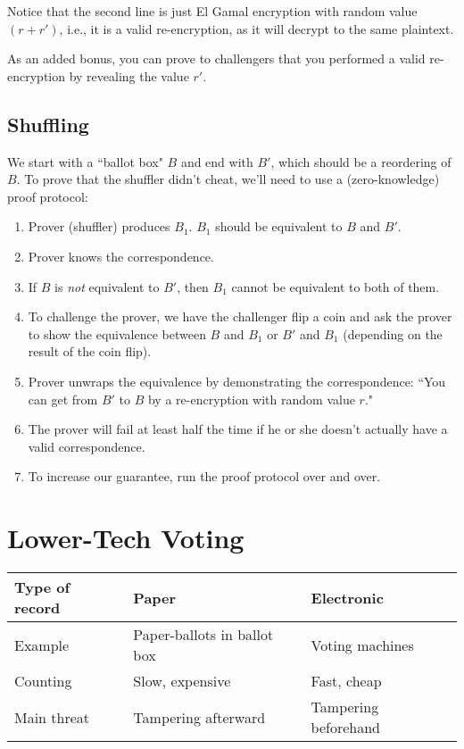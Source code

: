 \documentclass[12pt]{article}
\begin{document}
Notice that the second line is just El Gamal encryption with random value $(r + r')$, i.e., it is a valid re-encryption, as it will decrypt to the same plaintext.

As an added bonus, you can prove to challengers that you performed a valid re-encryption by revealing the value $r'$.

\subsection*{Shuffling}

We start with a ``ballot box" $B$ and end with $B'$, which should be a reordering of $B$. To prove that the shuffler didn't cheat, we'll need to use a (zero-knowledge) proof protocol:

\begin{enumerate}
\item Prover (shuffler) produces $B_1$. $B_1$ should be equivalent to $B$ and $B'$.
\item Prover knows the correspondence.
\item If $B$ is \textit{not} equivalent to $B'$, then $B_1$ cannot be equivalent to both of them.
\item To challenge the prover, we have the challenger flip a coin and ask the prover to show the equivalence between $B$ and $B_1$ or $B'$ and $B_1$ (depending on the result of the coin flip).
\item Prover unwraps the equivalence by demonstrating the correspondence: ``You can get from $B'$ to $B$ by a re-encryption with random value $r$."
\item The prover will fail at least half the time if he or she doesn't actually have a valid correspondence.
\item To increase our guarantee, run the proof protocol over and over.
\end{enumerate}

\section*{Lower-Tech Voting}

\begin{center}
    \begin{tabular}{| l | l | l |}
    \hline
    Type of record & Paper & Electronic \\ \hline
    Example & Paper-ballots in ballot box & Voting machines \\ \hline
    Counting & Slow, expensive & Fast, cheap \\ \hline
    Main threat & Tampering afterward & Tampering beforehand \\ \hline
    \end{tabular}
\end{center}
\end{document}
